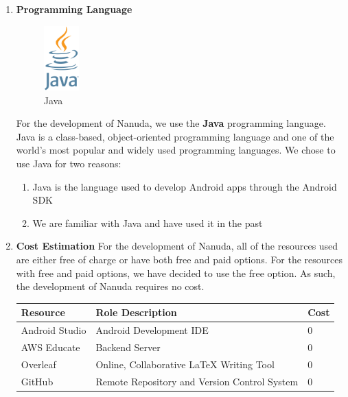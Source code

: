 \documentclass[conference]{IEEEtran}
\begin{document}
\begin{enumerate}
    \item \textbf{Programming Language}
        \newline
        \begin{figure}[htbp]
            \centerline{\includegraphics[height=25mm,scale=0.5]{img/logo-java.png}}
            \caption{Java}
            \label{fig:my_label}
        \end{figure}
        \newline
        For the development of Nanuda, we use the \textbf{Java} programming language. Java is a class-based, object-oriented programming language and one of the world's most popular and widely used programming languages. We chose to use Java for two reasons:
        \begin{enumerate}
            \item Java is the language used to develop Android apps through the Android SDK
            \item We are familiar with Java and have used it in the past
        \end{enumerate}
    \item \textbf{Cost Estimation}
        \newline
        For the development of Nanuda, all of the resources used are either free of charge or have both free and paid options. For the resources with free and paid options, we have decided to use the free option. As such, the development of Nanuda requires no cost.
        \begin{center}
            \begin{tabular}{|p{6em}|p{10em}|p{4em}|}
                \hline
                \textbf{Resource} & \textbf{Role Description} & \textbf{Cost} \\
                \hline
                Android Studio & Android Development IDE & 0 \\
                \hline
                AWS Educate & Backend Server & 0 \\
                \hline
                Overleaf & Online, Collaborative LaTeX Writing Tool & 0 \\
                \hline
                GitHub & Remote Repository and Version Control System & 0 \\

\end{tabular}
\end{center}
\end{enumerate}
\end{document}
